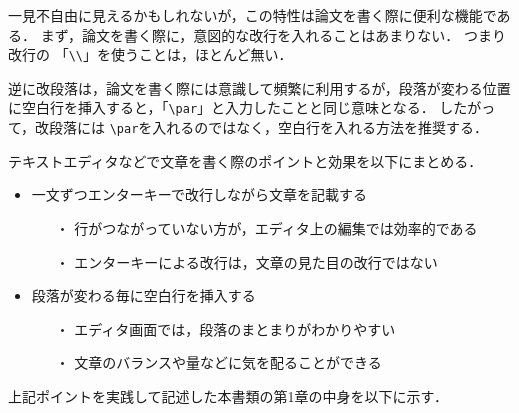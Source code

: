 一見不自由に見えるかもしれないが，この特性は論文を書く際に便利な機能である．
まず，論文を書く際に，意図的な改行を入れることはあまりない．
つまり改行の 「\verb+\\+」を使うことは，ほとんど無い．

逆に改段落は，論文を書く際には意識して頻繁に利用するが，段落が変わる位置に空白行を挿入すると，「\verb+\par+」と入力したことと同じ意味となる．
したがって，改段落には \verb+\par+を入れるのではなく，空白行を入れる方法を推奨する．

テキストエディタなどで文章を書く際のポイントと効果を以下にまとめる．
\begin{itemize}
\item 一文ずつエンターキーで改行しながら文章を記載する
\begin{itemize}
\item[・] 行がつながっていない方が，エディタ上の編集では効率的である
\item[・] エンターキーによる改行は，文章の見た目の改行ではない
\end{itemize}
\item 段落が変わる毎に空白行を挿入する
\begin{itemize}
\item[・] エディタ画面では，段落のまとまりがわかりやすい
\item[・] 文章のバランスや量などに気を配ることができる
\end{itemize}
\end{itemize}
上記ポイントを実践して記述した本書類の第1章の中身を以下に示す．

